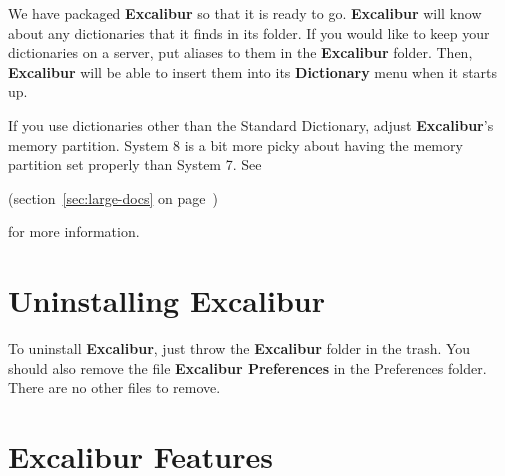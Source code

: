 ﻿\documentclass[11pt,titlepage]{article}
\newcommand{\ex}{\textbf{Excalibur}}
\begin{document}
We have packaged \ex{} so that it is ready to go.  \ex{} will know
about any dictionaries that it finds in its folder.  If you would like
to keep your dictionaries on a server, put aliases to them in the
\ex{} folder.  Then, \ex{} will be able to insert them into its
\textbf{Dictionary} menu when it starts up.

If you use dictionaries other than the Standard Dictionary, adjust
\ex's memory partition.  System 8 is a bit more picky about having the
memory partition set properly than System 7.  See
\begin{latexonly}
  (section~\ref{sec:large-docs} on page~\pageref{sec:large-docs})
\end{latexonly}
for more information.

\section{Uninstalling Excalibur}

To uninstall \ex, just throw the \ex{} folder in the trash.  You
should also remove the file \textbf{Excalibur Preferences} in the
Preferences folder.  There are no other files to remove.

\section{Excalibur Features}
\end{document}
